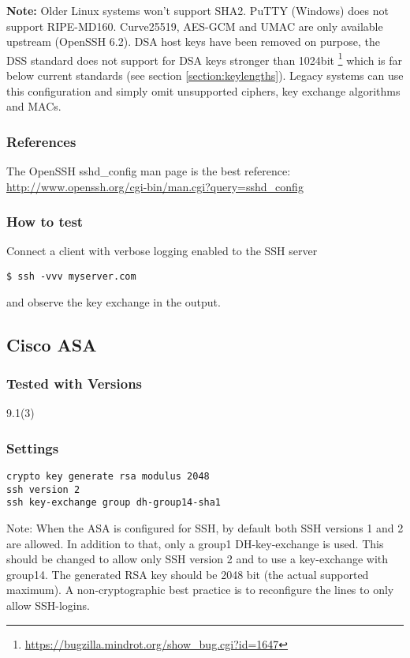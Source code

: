 \textbf{Note:} Older Linux systems won't support SHA2. PuTTY (Windows) does not support
RIPE-MD160. Curve25519, AES-GCM and UMAC are only available upstream (OpenSSH
6.2). DSA host keys have been removed on purpose, the DSS standard does not
support for DSA keys stronger than 1024bit
\footnote{\url{https://bugzilla.mindrot.org/show_bug.cgi?id=1647}} which is far
below current standards (see section \ref{section:keylengths}). Legacy systems
can use this configuration and simply omit unsupported ciphers, key exchange
algorithms and MACs.  

\subsubsection{References}
The OpenSSH sshd\_config  man page is the best reference: \url{http://www.openssh.org/cgi-bin/man.cgi?query=sshd_config}

\subsubsection{How to test}
Connect a client with verbose logging enabled to the SSH server
\begin{lstlisting}
$ ssh -vvv myserver.com
\end{lstlisting}and observe the key exchange in the output.


\subsection{Cisco ASA}
\subsubsection{Tested with Versions}
\begin{itemize*}
  \item 9.1(3)
\end{itemize*}


\subsubsection{Settings}
\begin{lstlisting}
crypto key generate rsa modulus 2048
ssh version 2
ssh key-exchange group dh-group14-sha1
\end{lstlisting}
Note: When the ASA is configured for SSH, by default both SSH versions 1 and 2 are allowed. In addition to that, only a group1 DH-key-exchange is used. This should be changed to allow only SSH version 2 and to use a key-exchange with group14. The generated RSA key should be 2048 bit (the actual supported maximum). A non-cryptographic best practice is to reconfigure the lines to only allow SSH-logins.

